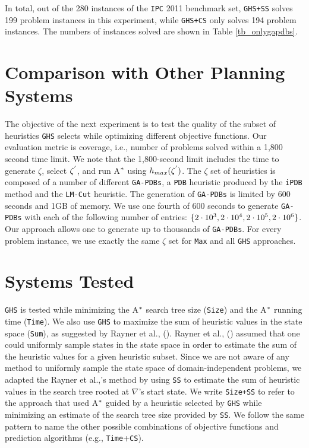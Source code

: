 In total, out of the 280 instances of the \texttt{IPC} 2011 benchmark set, \texttt{GHS+SS} solves 199 problem instances in this experiment, while \texttt{GHS+CS} only solves 194 problem instances. The numbers of instances solved are shown in Table \ref{tb_onlygapdbs}.

\section{Comparison with Other Planning Systems}

\noindent
The objective of the next experiment is to test the quality of the subset of heuristics \texttt{GHS} selects while optimizing different objective functions. Our evaluation metric is coverage, i.e., number of problems solved within a 1,800 second time limit. We note that the 1,800-second limit includes the time to generate $\zeta$, select $\zeta\sp{'}$, and run A$\sp{*}$ using $h_{max}(\zeta\sp{'})$. The $\zeta$ set of heuristics is composed of a number of different \texttt{GA-PDBs}, a \texttt{PDB} heuristic produced by the \texttt{iPDB} method and the \texttt{LM-Cut} heuristic. The generation of \texttt{GA-PDBs} is limited by 600 seconds and 1GB of memory. We use one fourth of 600 seconds to generate \texttt{GA-PDBs} with each of the following number of entries: $\{2 \cdot 10\sp{3}, 2 \cdot 10\sp{4}, 2 \cdot 10\sp{5}, 2 \cdot 10\sp{6}\}$. Our approach allows one to generate up to thousands of \texttt{GA-PDBs}. For every problem instance, we use exactly the same $\zeta$ set for \texttt{Max} and all \texttt{GHS} approaches.

\section{Systems Tested}

\noindent
\texttt{GHS} is tested while minimizing the A$\sp{*}$ search tree size (\texttt{Size}) and the A$\sp{*}$ running time (\texttt{Time}). We also use \texttt{GHS} to maximize the sum of heuristic values in the state space (\texttt{Sum}), as suggested by Rayner et al., (\citeyear{raynersss13}). Rayner et al., (\citeyear{raynersss13}) assumed that one could uniformly sample states in the state space in order to estimate the sum of the heuristic values for a given heuristic subset. Since we are not aware of any method to uniformly sample the state space of domain-independent problems, we adapted the Rayner et al.,'s method by using \texttt{SS} to estimate the sum of heuristic values in the search tree rooted at $\nabla$'s start state. We write \texttt{Size+SS} to refer to the approach that used A$\sp{*}$ guided by a heuristic selected by \texttt{GHS} while minimizing an estimate of the search tree size provided by \texttt{SS}. We follow the same pattern to name the other possible combinations of objective functions and prediction algorithms (e.g., \texttt{Time}+\texttt{CS}).

